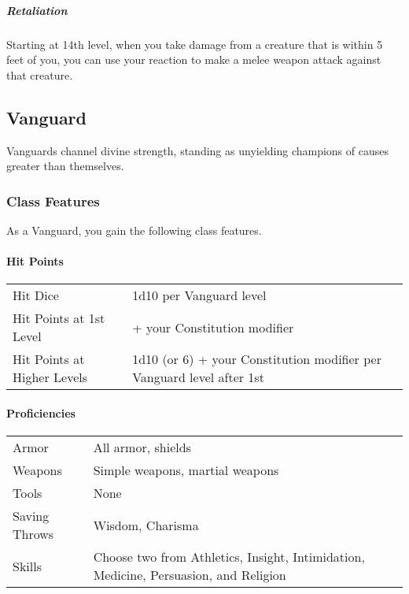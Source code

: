 \subparagraph{Retaliation}\label{dreadnought-subclasse-berserker-feature-retaliation}

Starting at 14th level, when you take damage from a creature that is
within 5 feet of you, you can use your reaction to make a melee weapon
attack against that creature.

\subsection{Vanguard}\label{vanguard-class}

Vanguards channel divine strength, standing as unyielding champions of
causes greater than themselves.

\subsubsection{Class Features}\label{_class_features_2}

As a Vanguard, you gain the following class features.

\paragraph{Hit Points}\label{_hit_points_2}

\begin{longtable}[]{@{}
  >{\raggedright\arraybackslash}p{}
  >{\raggedright\arraybackslash}p{}@{}}
\toprule\noalign{}
\endhead
\bottomrule\noalign{}
\endlastfoot
Hit Dice & 1d10 per Vanguard level \\
Hit Points at 1st Level & 10 + your Constitution modifier \\
Hit Points at Higher Levels & 1d10 (or 6) + your Constitution modifier
per Vanguard level after 1st \\
\end{longtable}

\paragraph{Proficiencies}\label{_proficiencies_2}

\begin{longtable}[]{@{}
  >{\raggedright\arraybackslash}p{}
  >{\raggedright\arraybackslash}p{}@{}}
\toprule\noalign{}
\endhead
\bottomrule\noalign{}
\endlastfoot
Armor & All armor, shields \\
Weapons & Simple weapons, martial weapons \\
Tools & None \\
Saving Throws & Wisdom, Charisma \\
Skills & Choose two from Athletics, Insight, Intimidation, Medicine,
Persuasion, and Religion \\
\end{longtable}

